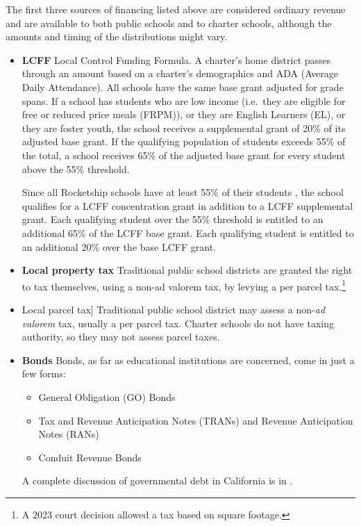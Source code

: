 The first three sources of financing listed above are considered ordinary revenue and are available to both public schools and to charter schools, although the amounts and timing of the distributions might vary.

\begin{itemize}
  \item \textbf{LCFF} Local Control Funding Formula. A charter's home district passes through an amount based on a charter's demographics and ADA (Average Daily Attendance). All schools have the same base grant adjusted for grade spans.  If a school has students who are low income (i.e.~they are eligible for free or reduced price meals (FRPM)), or they are English Learners (EL), or they are foster youth, the school receives a supplemental grant of 20\% of its adjusted base grant. If the qualifying population of students exceeds 55\% of the total, a school receives 65\% of the adjusted base grant for every student above the 55\% threshold.

Since all Rocketship schools have at least 55\% of their students , the school qualifies for a LCFF concentration grant in addition to a LCFF supplemental grant. Each qualifying student over the 55\% threshold is entitled to an additional 65\% of the LCFF base grant. Each qualifying student is entitled to an additional 20\% over the base LCFF grant.\\
    \item \textbf{Local property tax} Traditional public school districts are granted the right to tax themselves, using a non-ad valorem tax, by levying a per parcel tax.\footnote{A 2023 court decision allowed a tax based on square footage.}
  \item Local parcel tax] Traditional public school district may assess a non-\textit{ad valorem} tax, usually a per parcel tax. Charter schools do not have taxing authority, so they may not assess parcel taxes.
  \item \textbf{Bonds} Bonds, as far as educational institutions are concerned, come in just a few forms:
        \begin{itemize}
          \item General Obligation (GO) Bonds
          \item Tax and Revenue Anticipation Notes (TRANs) and Revenue Anticipation Notes (RANs)
          \item Conduit Revenue Bonds
        \end{itemize}
  A complete discussion of governmental debt in California is in \textcite{CDIAC2023}.
  

\end{itemize}
